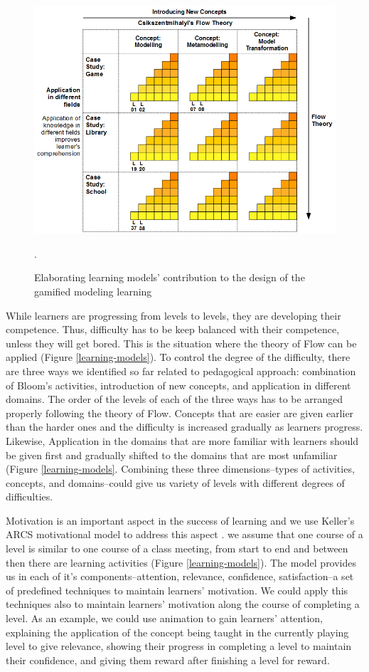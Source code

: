 \documentclass[12pt, a4paper]{report}
\begin{document}
\begin{figure}[ht]
\centering
\includegraphics[width=\textwidth]{learning-models2}
\caption{Elaborating learning models' contribution to the design of the gamified modeling learning}.
\label{learning-models2}
\end{figure}

While learners are progressing from levels to levels, they are developing their competence. Thus, difficulty has to be keep balanced with their competence, unless they will get bored. This is the situation where the theory of Flow can be applied (Figure \ref{learning-models}). To control the degree of the difficulty, there are three ways we identified so far related to pedagogical approach: combination of Bloom's activities, introduction of new concepts, and application in different domains. The order of the levels of each of the three ways has to be arranged properly following the theory of Flow. Concepts that are easier are given earlier than the harder ones and the difficulty is increased gradually as learners progress. Likewise, Application in the domains that are more familiar with learners should be given first and gradually shifted to the domains that are most unfamiliar (Figure \ref{learning-models}. Combining these three dimensions--types of activities, concepts, and domains--could give us variety of levels with different degrees of difficulties.

Motivation is an important aspect in the success of learning and we use Keller's ARCS motivational model to address this aspect \cite{keller2010motivational}. we assume that one course of a level is similar to one course of a class meeting, from start to end and between then there are learning activities (Figure \ref{learning-models}). The model provides us in each of it's components--attention, relevance, confidence, satisfaction--a set of predefined techniques to maintain learners' motivation. We could apply this techniques also to maintain learners' motivation along the course of completing a level. As an example, we could use animation to gain learners' attention, explaining the application of the concept being taught in the currently playing level to give relevance, showing their progress in completing a level to maintain their confidence, and giving them reward after finishing a level for reward.
           
\end{document}
